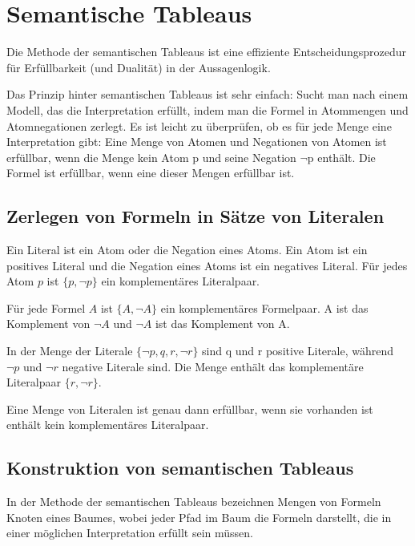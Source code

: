 \section{Semantische Tableaus}
Die Methode der semantischen Tableaus ist eine effiziente Entscheidungsprozedur für Erfüllbarkeit (und Dualität) in der Aussagenlogik.

Das Prinzip hinter semantischen Tableaus ist sehr einfach: Sucht man nach einem Modell, das die Interpretation erfüllt, indem man die Formel in Atommengen und Atomnegationen zerlegt. Es ist leicht zu überprüfen, ob es für jede Menge eine Interpretation gibt: Eine Menge von Atomen und Negationen von Atomen ist erfüllbar, wenn die Menge kein Atom p und seine Negation $\neg$p enthält. Die Formel ist erfüllbar, wenn eine dieser Mengen erfüllbar ist.

\subsection{Zerlegen von Formeln in Sätze von Literalen}

\begin{defi} \label{Definition 2.57} \end{defi} Ein Literal ist ein Atom oder die Negation eines Atoms. Ein Atom ist ein positives Literal und die Negation eines Atoms ist ein negatives Literal. Für jedes Atom $p$ ist $\{p, \neg p\}$ ein komplementäres Literalpaar.

Für jede Formel $A$ ist $\{A, \neg A\}$ ein komplementäres Formelpaar. A ist das Komplement von $\neg A$ und $\neg A$ ist das Komplement von A.

\begin{ex} \label{Beispiel 2.58} \end{ex} In der Menge der Literale $ \{ \neg p, q, r, \neg r \} $ sind q und r positive Literale, während $\neg p$ und $\neg r$ negative Literale sind. Die Menge enthält das komplementäre Literalpaar $ \{ r, \neg r \}$.
 
\begin{sa} \label{Satz 2.60 } \end{sa}Eine Menge von Literalen ist genau dann erfüllbar, wenn sie vorhanden ist
enthält kein komplementäres Literalpaar.


\subsection{Konstruktion von semantischen Tableaus}
In der Methode der semantischen Tableaus bezeichnen Mengen von Formeln Knoten eines Baumes, wobei jeder Pfad im Baum die Formeln darstellt, die in einer möglichen Interpretation erfüllt sein müssen.

